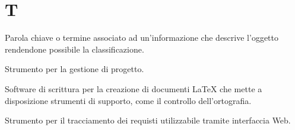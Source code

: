 \section{T}
Parola chiave o termine associato ad un'informazione che descrive l'oggetto rendendone possibile la classificazione.

Strumento per la gestione di progetto.

Software di scrittura per la creazione di documenti \LaTeX{} che mette a disposizione strumenti di supporto, come il controllo dell'ortografia.

Strumento per il tracciamento dei requisti utilizzabile tramite interfaccia Web.
